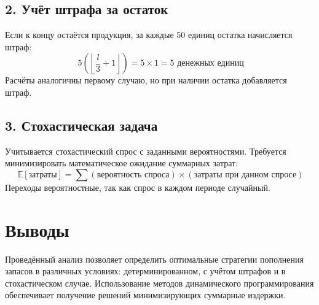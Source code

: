 \documentclass[12pt,a4paper]{article}
\begin{document}
\subsection*{2. Учёт штрафа за остаток}
Если к концу остаётся продукция, за каждые 50 единиц остатка начисляется штраф:
\[\
5 \left( \left\lfloor \frac{l}{3} + 1 \right\rfloor \right) = 5 \times 1 = 5 \text{ денежных единиц}
\]
Расчёты аналогичны первому случаю, но при наличии остатка добавляется штраф.

\subsection*{3. Стохастическая задача}
Учитывается стохастический спрос с заданными вероятностями. Требуется минимизировать математическое ожидание суммарных затрат:
\[\
\mathbb{E}[\text{затраты}] = \sum (\text{вероятность спроса}) \times (\text{затраты при данном спросе})
\]
Переходы вероятностные, так как спрос в каждом периоде случайный.

\section*{Выводы}
Проведённый анализ позволяет определить оптимальные стратегии пополнения запасов в различных условиях: детерминированном, с учётом штрафов и в стохастическом случае. Использование методов динамического программирования обеспечивает получение решений минимизирующих суммарные издержки.
\end{document}
